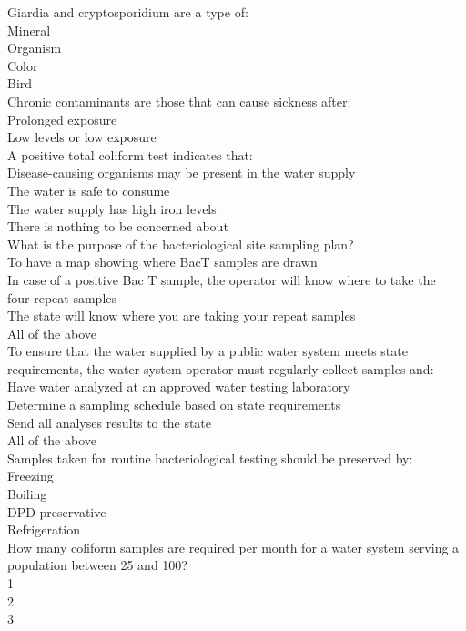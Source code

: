 Giardia and cryptosporidium are a type of:\\
Mineral\\
Organism\\
Color\\
Bird\\
Chronic contaminants are those that can cause sickness after:\\
Prolonged exposure\\
Low levels or low exposure\\
A positive total coliform test indicates that:\\
Disease-causing organisms may be present in the water supply\\
The water is safe to consume\\
The water supply has high iron levels\\
There is nothing to be concerned about\\
What is the purpose of the bacteriological site sampling plan?\\
To have a map showing where BacT samples are drawn\\
In case of a positive Bac T sample, the operator will know where to take the\\
four repeat samples\\
The state will know where you are taking your repeat samples\\
All of the above\\
To ensure that the water supplied by a public water system meets state requirements, the water system operator must regularly collect samples and:\\
Have water analyzed at an approved water testing laboratory\\
Determine a sampling schedule based on state requirements\\
Send all analyses results to the state\\
All of the above\\
Samples taken for routine bacteriological testing should be preserved by:\\
Freezing\\
Boiling\\
DPD preservative\\
Refrigeration\\
How many coliform samples are required per month for a water system serving a population between 25 and 100?\\
1\\
2\\
3\\
